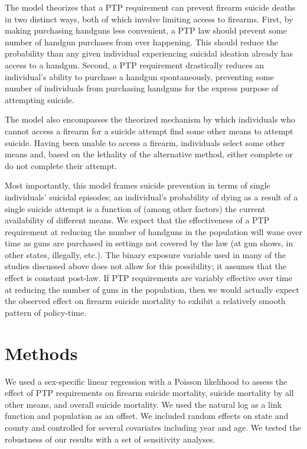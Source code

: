 \documentclass[]{article}
\begin{document}
The model theorizes that a PTP requirement can prevent firearm suicide
deaths in two distinct ways, both of which involve limiting access to
firearms. First, by making purchasing handguns less convenient, a PTP
law should prevent some number of handgun purchases from ever happening.
This should reduce the probability than any given individual
experiencing suicidal ideation already has access to a handgun. Second,
a PTP requirement drastically reduces an individual's ability to
purchase a handgun spontaneously, preventing some number of individuals
from purchasing handguns for the express purpose of attempting suicide.

The model also encompasses the theorized mechanism by which individuals
who cannot access a firearm for a suicide attempt find some other means
to attempt suicide. Having been unable to access a firearm, individuals
select some other means and, based on the lethality of the alternative
method, either complete or do not complete their attempt.

Most importantly, this model frames suicide prevention in terms of
single individuals' suicidal episodes; an individual's probability of
dying as a result of a single suicide attempt is a function of (among
other factors) the current availability of different means. We expect
that the effectiveness of a PTP requirement at reducing the number of
handguns in the population will wane over time as guns are purchased in
settings not covered by the law (at gun shows, in other states,
illegally, etc.). The binary exposure variable used in many of the
studies discussed above does not allow for this possibility; it assumes
that the effect is constant post-law. If PTP requirements are variably
effective over time at reducing the number of guns in the population,
then we would actually expect the observed effect on firearm suicide
mortality to exhibit a relatively smooth pattern of policy-time.

\section{Methods}\label{methods}

We used a sex-specific linear regression with a Poisson likelihood to
assess the effect of PTP requirements on firearm suicide mortality,
suicide mortality by all other means, and overall suicide mortality. We
used the natural log as a link function and population as an offset. We
included random effects on state and county and controlled for several
covariates including year and age. We tested the robustness of our
results with a set of sensitivity analyses.
\end{document}
